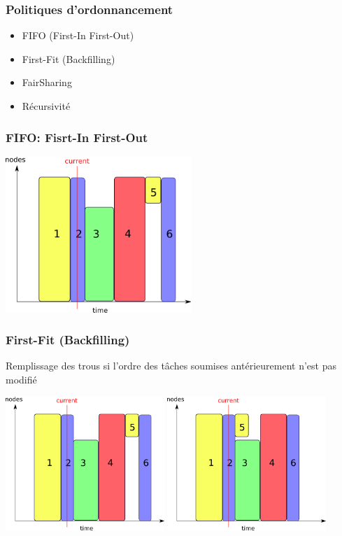 \documentclass{beamer}
\begin{document}
\begin{frame}
	\frametitle{Politiques d'ordonnancement}
		\begin{itemize}
		\item FIFO (First-In First-Out)
		\item First-Fit (Backfilling)
		\item FairSharing
    \item Récursivité
	\end{itemize}

\end{frame}

\begin{frame}
	\frametitle{FIFO: Fisrt-In First-Out}
	\begin{center}
		\includegraphics[width=7cm]{fifo.png}
	\end{center}

\end{frame}

\begin{frame}
	\frametitle{ First-Fit (Backfilling)}
	Remplissage des trous si l'ordre des tâches soumises antérieurement n'est pas modifié
	\begin{center}
			\includegraphics[width=6cm]{fifo.png}
		\includegraphics[width=6cm]{cbf.png}
	\end{center}

\end{frame}
\end{document}
